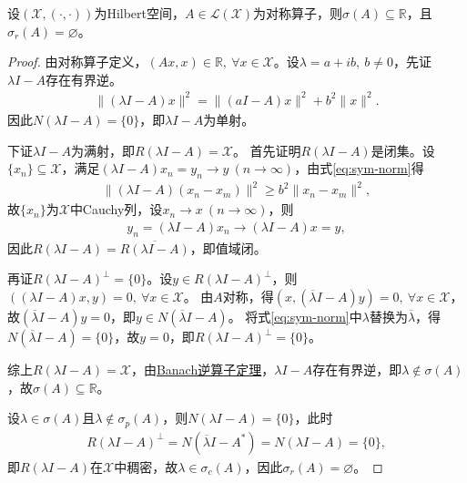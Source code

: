 \documentclass[../../main.tex]{subfiles}%
\begin{document}
\begin{proposition}
设$(\mathscr{X},(\cdot,\cdot))$为Hilbert空间，$A\in\mathscr{L}(\mathscr{X})$为对称算子，则$\sigma(A)\subseteq\mathbb{R}$，且$\sigma_r(A)=\varnothing $。
\end{proposition}
\begin{proof}

由对称算子定义，$(Ax,x)\in\mathbb{R},\ \forall x\in\mathscr{X}$。设$\lambda=a+ib,\ b\neq0$，先证$\lambda I-A$存在有界逆。
\begin{align}
\|(\lambda I-A)x\|^2=\|(aI-A)x\|^2+b^2\|x\|^2.
\label{eq:sym-norm}
\end{align}
因此$N(\lambda I-A)=\{0\}$，即$\lambda I-A$为单射。

下证$\lambda I-A$为满射，即$R(\lambda I-A)=\mathscr{X}$。
首先证明$R(\lambda I-A)$是闭集。设$\{x_n\}\subseteq\mathscr{X}$，满足$(\lambda I-A)x_n=y_n\to y\ (n\to\infty)$，由式\eqref{eq:sym-norm}得
\begin{align*}
\|(\lambda I-A)(x_n-x_m)\|^2\geqslant b^2\|x_n-x_m\|^2,
\end{align*}
故$\{x_n\}$为$\mathscr{X}$中Cauchy列，设$x_n\to x\ (n\to\infty)$，则
\begin{align*}
y_n=(\lambda I-A)x_n\to(\lambda I-A)x=y,
\end{align*}
因此$R(\lambda I-A)=\overline{R(\lambda I-A)}$，即值域闭。

再证$R(\lambda I-A)^{\perp}=\{0\}$。设$y\in R(\lambda I-A)^{\perp}$，则$((\lambda I-A)x,y)=0,\ \forall x\in\mathscr{X}$。
由$A$对称，得$(x,(\overline{\lambda}I-A)y)=0,\ \forall x\in\mathscr{X}$，故$(\overline{\lambda}I-A)y=0$，即$y\in N(\overline{\lambda}I-A)$。
将式\eqref{eq:sym-norm}中$\lambda$替换为$\overline{\lambda}$，得$N(\overline{\lambda}I-A)=\{0\}$，故$y=0$，即$R(\lambda I-A)^{\perp}=\{0\}$。

综上$R(\lambda I-A)=\mathscr{X}$，由\hyperref[theorem:泛函分析--Banach逆算子定理]{Banach逆算子定理}，$\lambda I-A$存在有界逆，即$\lambda\notin\sigma(A)$，故$\sigma(A)\subseteq\mathbb{R}$。

设$\lambda\in\sigma(A)$且$\lambda\notin\sigma_p(A)$，则$N(\lambda I-A)=\{0\}$，此时
\begin{align*}
R(\lambda I-A)^{\perp}=N(\overline{\lambda}I-A^*)=N(\lambda I-A)=\{0\},
\end{align*}
即$R(\lambda I-A)$在$\mathscr{X}$中稠密，故$\lambda\in\sigma_c(A)$，因此$\sigma_r(A)=\varnothing $。

\end{proof}
\end{document}

